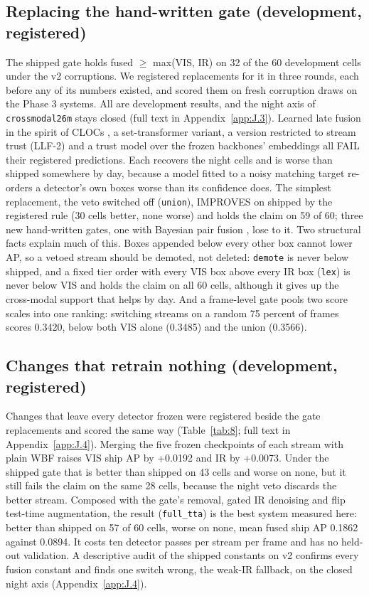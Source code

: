 \documentclass[10pt]{article}
\begin{document}
\subsection{Replacing the hand-written gate (development, registered)}\label{sec:6.9}
The shipped gate holds fused $\geq$ max(VIS, IR) on 32 of the 60 development cells under the v2 corruptions. We registered replacements for it in three rounds, each before any of its numbers existed, and scored them on fresh corruption draws on the Phase 3 systems. All are development results, and the night axis of \texttt{crossmodal26m} stays closed (full text in Appendix~\ref{app:J.3}). Learned late fusion in the spirit of CLOCs \citep{pang2020clocs}, a set-transformer variant, a version restricted to stream trust (LLF-2) and a trust model over the frozen backbones' embeddings all FAIL their registered predictions. Each recovers the night cells and is worse than shipped somewhere by day, because a model fitted to a noisy matching target re-orders a detector's own boxes worse than its confidence does. The simplest replacement, the veto switched off (\texttt{union}), IMPROVES on shipped by the registered rule (30 cells better, none worse) and holds the claim on 59 of 60; three new hand-written gates, one with Bayesian pair fusion \citep{chen2022multimodal}, lose to it. Two structural facts explain much of this. Boxes appended below every other box cannot lower AP, so a vetoed stream should be demoted, not deleted: \texttt{demote} is never below shipped, and a fixed tier order with every VIS box above every IR box (\texttt{lex}) is never below VIS and holds the claim on all 60 cells, although it gives up the cross-modal support that helps by day. And a frame-level gate pools two score scales into one ranking: switching streams on a random 75 percent of frames scores 0.3420, below both VIS alone (0.3485) and the union (0.3566).

\subsection{Changes that retrain nothing (development, registered)}\label{sec:6.10}
Changes that leave every detector frozen were registered beside the gate replacements and scored the same way (Table~\ref{tab:8}; full text in Appendix~\ref{app:J.4}). Merging the five frozen checkpoints of each stream with plain WBF raises VIS ship AP by +0.0192 and IR by +0.0073. Under the shipped gate that is better than shipped on 43 cells and worse on none, but it still fails the claim on the same 28 cells, because the night veto discards the better stream. Composed with the gate's removal, gated IR denoising and flip test-time augmentation, the result (\texttt{full\_\allowbreak{}tta}) is the best system measured here: better than shipped on 57 of 60 cells, worse on none, mean fused ship AP 0.1862 against 0.0894. It costs ten detector passes per stream per frame and has no held-out validation. A descriptive audit of the shipped constants on v2 confirms every fusion constant and finds one switch wrong, the weak-IR fallback, on the closed night axis (Appendix~\ref{app:J.4}).
\end{document}
